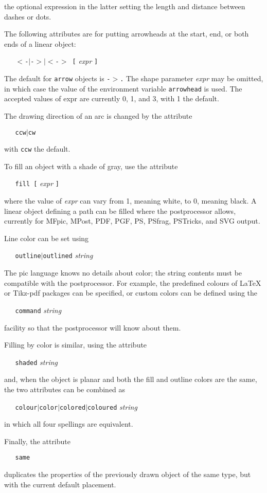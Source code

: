 the optional expression in the latter setting the length and distance
between dashes or dots.

The following attributes are for putting arrowheads at the start, end,
or both ends of a linear object:

{\tt \ \ \ $<$-$|$-$>$$|$$<$-$>$\ [}
{\it expr}
{\tt ]}

The default for
{\tt arrow}
objects is
{\tt -$>$.}
The shape parameter
{\it expr}
may be omitted, in which case the value of the environment variable
{\tt arrowhead}
is used.
The accepted values of expr are currently 0, 1, and 3, with 1 the default.

The drawing direction of an arc is changed by the attribute

{\tt \ \ \ ccw$|$cw}

with
{\tt ccw}
the default.

To fill an object with a shade of gray, use the attribute

{\tt \ \ \ fill\ [}
{\it expr}
{\tt ]}

where the value of
{\it expr}
can vary from 1, meaning white, to 0, meaning black.
A linear object defining a path can be filled where the postprocessor allows,
currently for MFpic, MPost, PDF, PGF, PS, PSfrag, PSTricks, and SVG output.

Line color can be set using

{\tt \ \ \ outline$|$outlined}
{\it string}

The pic language knows no details about color; the string contents must be
compatible with the postprocessor.
For example,
the predefined colours of LaTeX or Tikz-pdf packages can be specified,
or custom colors can be defined using the

{\tt \ \ \ command}
{\it string}

facility so that the postprocessor will know about them.

Filling by color is similar, using the attribute

{\tt \ \ \ shaded}
{\it string}

and, when the object is planar and both the fill and outline colors
are the same, the two attributes can be combined as

{\tt \ \ \ colour$|$color$|$colored$|$coloured}
{\it string}

in which all four spellings are equivalent.

Finally, the attribute

{\tt \ \ \ same}

duplicates the properties of the previously drawn object of the same type,
but with the current default placement.

